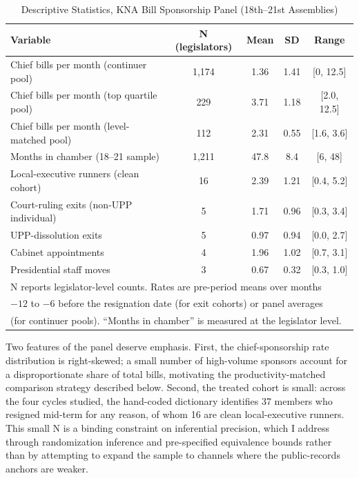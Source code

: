 \documentclass[11pt]{article}
\begin{document}
\begin{table}[H]
\centering
\caption{Descriptive Statistics, KNA Bill Sponsorship Panel (18th--21st Assemblies)}
\label{tab:desc}
\begin{tabular}{lcccc}
\toprule
Variable & N (legislators) & Mean & SD & Range \\
\midrule
Chief bills per month (continuer pool) & 1{,}174 & 1.36 & 1.41 & [0, 12.5] \\
Chief bills per month (top quartile pool) & 229 & 3.71 & 1.18 & [2.0, 12.5] \\
Chief bills per month (level-matched pool) & 112 & 2.31 & 0.55 & [1.6, 3.6] \\
Months in chamber (18--21 sample) & 1{,}211 & 47.8 & 8.4 & [6, 48] \\
Local-executive runners (clean cohort) & 16 & 2.39 & 1.21 & [0.4, 5.2] \\
Court-ruling exits (non-UPP individual) & 5 & 1.71 & 0.96 & [0.3, 3.4] \\
UPP-dissolution exits & 5 & 0.97 & 0.94 & [0.0, 2.7] \\
Cabinet appointments & 4 & 1.96 & 1.02 & [0.7, 3.1] \\
Presidential staff moves & 3 & 0.67 & 0.32 & [0.3, 1.0] \\
\bottomrule
\multicolumn{5}{l}{\footnotesize N reports legislator-level counts. Rates are pre-period means over months} \\
\multicolumn{5}{l}{\footnotesize $-12$ to $-6$ before the resignation date (for exit cohorts) or panel averages} \\
\multicolumn{5}{l}{\footnotesize (for continuer pools). ``Months in chamber'' is measured at the legislator level.} \\
\end{tabular}
\end{table}

Two features of the panel deserve emphasis. First, the chief-sponsorship rate distribution is right-skewed; a small number of high-volume sponsors account for a disproportionate share of total bills, motivating the productivity-matched comparison strategy described below. Second, the treated cohort is small: across the four cycles studied, the hand-coded dictionary identifies 37 members who resigned mid-term for any reason, of whom 16 are clean local-executive runners. This small N is a binding constraint on inferential precision, which I address through randomization inference and pre-specified equivalence bounds rather than by attempting to expand the sample to channels where the public-records anchors are weaker.
\end{document}
